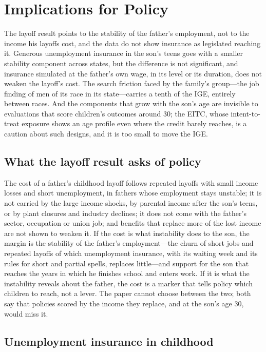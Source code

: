 \section{Implications for Policy}\label{sec:policy}

The layoff result points to the stability of the father's employment, not to the income his layoffs cost, and the data
do not show insurance as legislated reaching it. Generous unemployment insurance in the son's teens goes with a
smaller stability component across states, but the difference is not significant, and insurance simulated at the
father's own wage, in its level or its duration, does not weaken the layoff's cost. The search friction faced by the
family's group---the job finding of men of its race in its state---carries a tenth of the IGE, entirely between races.
And the components that grow with the son's age are invisible to evaluations that score children's outcomes around 30;
the EITC, whose intent-to-treat exposure shows an age profile even where the credit barely reaches, is a caution about
such designs, and it is too small to move the IGE.

\subsection{What the layoff result asks of policy}

The cost of a father's childhood layoff follows repeated layoffs with small income losses and short unemployment, in
fathers whose employment stays unstable; it is not carried by the large income shocks, by parental income after the
son's teens, or by plant closures and industry declines; it does not come with the father's sector, occupation or union
job; and benefits that replace more of the lost income are not shown to weaken it. If the cost is what instability does
to the son, the margin is the stability of the father's employment---the churn of short jobs and repeated layoffs of
which unemployment insurance, with its waiting week and its rules for short and partial spells, replaces
little---and support for the son that reaches the years in which he finishes school and enters work. If it is what the
instability reveals about the father, the cost is a marker that tells policy which children to reach, not a lever. The
paper cannot choose between the two; both say that policies scored by the income they replace, and at the son's age
30, would miss it.

\subsection{Unemployment insurance in childhood}

